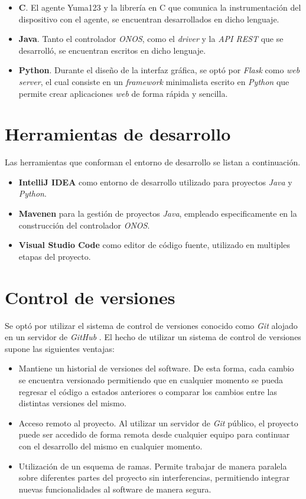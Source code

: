\begin{itemize}
	\item \textbf{C}. El agente Yuma123 y la librería en C que comunica la instrumentación del dispositivo con el agente, se encuentran desarrollados en dicho lenguaje.  
	\item \textbf{Java}. Tanto el controlador \textit{ONOS}, como el \textit{driver} y la \textit{API REST} que se desarrolló, se encuentran escritos en dicho lenguaje. 
	\item \textbf{Python}. Durante el diseño de la interfaz gráfica, se optó por \textit{Flask} como \textit{web server}, el cual consiste en un \textit{framework} minimalista escrito en \textit{Python} que permite crear aplicaciones \textit{web} de forma rápida y sencilla. 
\end{itemize}

\section{Herramientas de desarrollo}
Las herramientas que conforman el entorno de desarrollo se listan a continuación.

\begin{itemize}
	\item \textbf{IntelliJ IDEA} como entorno de desarrollo utilizado para proyectos \textit{Java} y \textit{Python}.  
	\item \textbf{Mavenen} para la gestión de proyectos \textit{Java}, empleado especificamente en la construcción del controlador \textit{ONOS}.
	\item \textbf{Visual Studio Code} como editor de código fuente, utilizado en multiples etapas del proyecto.
\end{itemize}

\section{Control de versiones}
Se optó por utilizar el sistema de control de versiones conocido como \textit{Git} \parencite{gitref} alojado en un servidor de \textit{GitHub} \parencite{githubref}. El hecho de utilizar un sistema de control de versiones supone las siguientes ventajas:

\begin{itemize}
	\item Mantiene un historial de versiones del software. De esta forma, cada cambio se encuentra versionado permitiendo que en cualquier momento se pueda regresar el código a estados anteriores o comparar los cambios entre las distintas versiones del mismo.   
	\item Acceso remoto al proyecto. Al utilizar un servidor de \textit{Git} público, el proyecto puede ser accedido de forma remota desde cualquier equipo para continuar con el desarrollo del mismo en cualquier momento.
	\item Utilización de un esquema de ramas. Permite trabajar de manera paralela sobre diferentes partes del proyecto sin interferencias, permitiendo integrar nuevas funcionalidades al software de manera segura.
\end{itemize}

